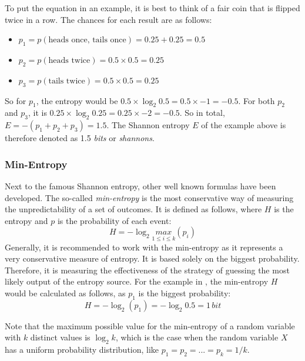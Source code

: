 \noindent
To put the equation in an example, it is best to think of a fair coin that is flipped twice in a row. The chances for each result are as follows:
\begin{itemize}
    \item $p_1 = p(\text{heads once, tails once}) = 0.25 + 0.25 = 0.5$
    \item $p_2 = p(\text{heads twice}) = 0.5 \times 0.5 = 0.25$
    \item $p_3 = p(\text{tails twice}) = 0.5 \times 0.5 = 0.25$
\end{itemize}

\noindent
So for $p_1$, the entropy would be $0.5 \times \log_2 0.5 = 0.5 \times -1 = -0.5$.
For both $p_2$ and $p_3$, it is $0.25 \times \log_2 0.25 = 0.25 \times -2 = -0.5$.
\newline
So in total, $E = -\left( p_1 + p_2 + p_3 \right) = 1.5$. The Shannon entropy $E$ of the example above is therefore denoted as 1.5 \emph{bits} or \emph{shannons}.


\subsubsection{Min-Entropy}
Next to the famous Shannon entropy, other well known formulas have been developed. 
The so-called \emph{min-entropy} is the most conservative way of measuring the unpredictability of a set of outcomes. It is defined as follows, where $H$ is the entropy and $p$ is the probability of each event:
\begin{equation}
    H = -\log_2 \underset{1 \le i\le k}{max} \left(p_i\right)
\end{equation}
\noindent
Generally, it is recommended to work with the min-entropy as it represents a very conservative measure of entropy.
It is based solely on the biggest probability. Therefore, it is measuring the effectiveness of the strategy of guessing the most likely output of the entropy source\cite{randomness:sources2}.
\newline
For the example in , the min-entropy $H$ would be calculated as follows, as $p_1$ is the biggest probability:
\begin{equation}
    H = -\log_2 \left(p_1\right) = -\log_2 0.5 = 1\,bit
\end{equation}

\noindent
Note that the maximum possible value for the min-entropy of a random variable with $k$ distinct values is $\log_2 k$, which is the case when the random variable $X$ has a uniform probability distribution, like $p_1 = p_2 = ... = p_k = 1/k$.

